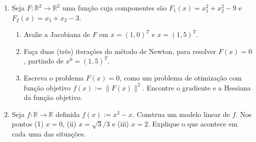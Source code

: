 \documentclass[a4paper,latin]{article}
\begin{document}
\begin{enumerate}
\begin{enumerate}
     Mostre o seguinte:
        \begin{enumerate}
        \item O passo de Armijo de segunda-ordem está bem definido, se temos que  
        $\nabla f(x^{k})^{T}z^{k}<0$ 
        ( quando $\nabla f(x^{k})\neq 0$)
        e
   ${d^{k}}^{T}\nabla^{2} f(x^{k})d^{k}<0$ 
        (quando $\nabla f(x^{k})=0$).
        \item Seja $f \in C^{2}(\mathbb{R}^{n})$ tal que
        $\{ x \in \mathbb{R}^{n}: f(x)\leq f(x^0)\}$ é compacto.
        Seja $\{x^{k}\}$ uma sequência que satisfaz a condição de Armijo de segunda-ordem, e suponha que as sequências $\{\|z^k\|\}$ 
        e $\{\|d^{k}\|\}$ são limitadas. 
        Prove que :
 $$
 \nabla f(x^k)^{T}z^k \rightarrow 0 \ \ \text{e} \ \  
 {d^{k}}^{T}\nabla^2 f(x^k) d^k \rightarrow 0.  
 $$       
     \item Se adicionalmente às hipoteses do item anterior, temos que existem constantes $c_{1},c_2, c_3>0$ tal que 
     \begin{enumerate}
     \item $\|z^{k}\|\geq c_3 \|\nabla f(x^k)\|$
     \item 
     ${d^{k}}^{T}\nabla^2 f(x^k) d^k
     \leq c_{2} \lambda_{min}(\nabla^2 f(x^k))$ 
     ( lembre que $\lambda_{min}(A)$ denota o mínimo autovalor de $A$).
     \item
      $-\nabla f(x^k)^{T}z^k 
      \geq c_1 \|\nabla f(x^k)\|\|z^k\|$.
     \end{enumerate}
    Então,  qualquer ponto de acumulação $x^*$ de $x^{k}$ é um ponto estacionário de segunda-ordem, isto é, 
  $\nabla f(x^*)=0$ e $\nabla^{2} f(x^*)\succeq 0$.
        \end{enumerate}
     {\bf Obs:} Além da condição de segunda-ordem de Armijo, outras condições de segunda-ordem são a condição de Goldfard, a condição de Moré-Sorensen, etc.   
     \end{enumerate}     
   \item Seja 
   $F:\mathbb{R}^{2}
   \rightarrow \mathbb{R}^{2}$ 
   uma função cuja componentes são
   $F_{1}(x)=x_1^2+x_2^2-9$ e  
   $F_{2}(x)=x_1+x_2-3$.   
     \begin{enumerate}
     \item Avalie a Jacobiana de $F$
     em $x=(1,0)^{T}$ e $x=(1,5)^{T}$.
     \item Faça duas (três) iterações do método de Newton, para resolver $F(x)=0$, partindo de $x^0=(1,5)^{T}$.
     \item Escreva o problema $F(x)=0$, como um problema de otimização com função objetivo $f(x):=\|F(x)\|^2$. 
     Encontre o gradiente e a Hessiana da 
     função objetivo.
     \end{enumerate}                 
    \item Seja $f:\mathbb{R}\rightarrow \mathbb{R}$ definida $f(x):=x^3-x$.
    Construa um modelo linear de $f$.
    Nos pontos (1) $x=0$, 
    (ii) $x=\sqrt{3}/3$ e
    (iii) $x=2$. Explique o que acontece em cada uma das situações. 
   \end{enumerate}    
\end{document}
